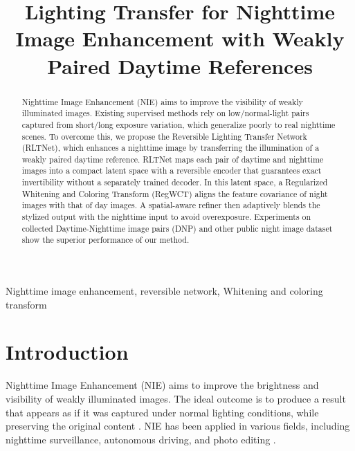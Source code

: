 \documentclass{article}
\title{Lighting Transfer for Nighttime Image Enhancement with Weakly Paired Daytime References}
\begin{document}
%
\maketitle
%
\begin{abstract}
Nighttime Image Enhancement (NIE) aims to improve the visibility of weakly illuminated images. Existing supervised methods rely on low/normal-light pairs captured from short/long exposure variation, which generalize poorly to real nighttime scenes. To overcome this, we propose the Reversible Lighting Transfer Network (RLTNet), which enhances a nighttime image by transferring the illumination of a weakly paired daytime reference. RLTNet maps each pair of daytime and nighttime images into a compact latent space with a reversible encoder that guarantees exact invertibility without a separately trained decoder. In this latent space, a Regularized Whitening and Coloring Transform (RegWCT) aligns the feature covariance of night images with that of day images. A spatial-aware refiner then adaptively blends the stylized output with the nighttime input to avoid overexposure. Experiments on collected Daytime-Nighttime image pairs (DNP) and other public night image dataset show the superior performance of our method.




\end{abstract}
%
\begin{keywords}
Nighttime image enhancement, reversible network, Whitening and coloring transform
\end{keywords}
%
\section{Introduction}
\label{sec:intro}




Nighttime Image Enhancement (NIE) aims to improve the brightness and visibility of weakly illuminated images. The ideal outcome is to produce a result that appears as if it was captured under normal lighting conditions, while preserving the original content \cite{surveyli}. NIE has been applied in various fields, including nighttime surveillance, autonomous driving, and photo editing \cite{surveykbs}.
\end{document}

